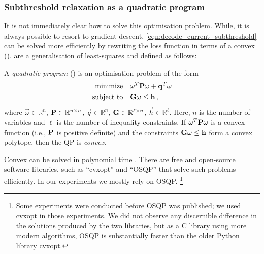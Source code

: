 \subsubsection{Subthreshold relaxation as a quadratic program}
It is not immediately clear how to solve this optimisation problem.
While, it is always possible to resort to gradient descent, \cref{eqn:decode_current_subthreshold} can be solved more efficiently by rewriting the loss function in terms of a convex \qprog (\QP).
\QPpl are a generalisation of least-squares and defined as follows:
\begin{definition}
\label{def:qp}
A \emph{quadratic program} (\QP) is an optimisation problem of the form \citep[adapted in slightly simplified form from][Section~4.4]{boyd2004convex}
\begin{align*}
	\text{minimize} &\quad
		\mathbf{\omega}^T \mathbf{P} \mathbf{\omega} + \mathbf{q}^T \mathbf{\omega} \\
	\text{subject to} &\quad
		\mathbf{G} \mathbf{\omega} \leq \mathbf{h} \,,
\end{align*}
where $\vec \omega \in \mathbb{R}^{n}$, $\mathbf{P} \in \mathbb{R}^{n \times n}$, $\vec q \in \mathbb{R}^{n}$, $\mathbf{G} \in \mathbb{R}^{\ell \times n}$, $\vec h \in \mathbb{R}^{\ell}$.
Here, $n$ is the number of variables and $\ell$ is the number of inequality constraints.
If $\mathbf{\omega}^T \mathbf{P} \mathbf{\omega}$ is a convex function (i.e., $\mathbf{P}$ is positive definite) and the constraints $\mathbf{G} \mathbf{\omega} \leq \mathbf{h}$ form a convex polytope, then the QP is \emph{convex}.
\end{definition}

Convex \qprogpl can be solved in polynomial time \citep{kozlov1980polynomial}.
There are free and open-source software libraries, such as \enquote{cvxopt} \citep{vandenberghe2010cvxopt} and \enquote{OSQP}  \citep{stellato2020osqp} that solve such problems efficiently.
In our experiments we mostly rely on OSQP.%
\footnote{Some experiments were conducted before OSQP was published; we used cvxopt in those experiments. We did not observe any discernible difference in the solutions produced by the two libraries, but as a C library using more modern algorithms, OSQP is substantially faster than the older Python library cvxopt.}

